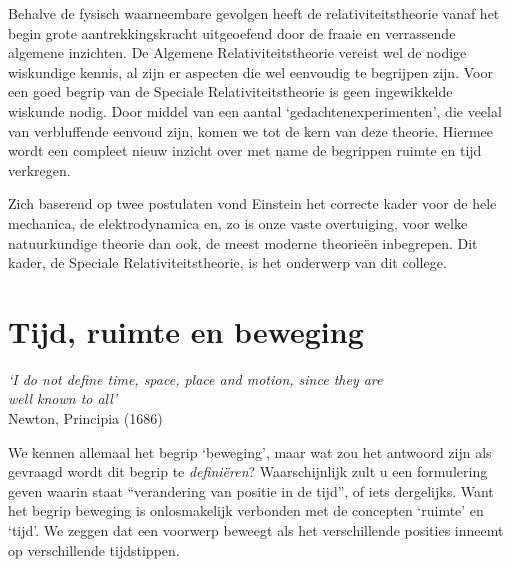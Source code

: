Behalve de fysisch waarneembare gevolgen heeft de relativiteitstheorie
vanaf het begin grote aantrekkingskracht uitgeoefend door de fraaie en
verrassende algemene inzichten. De Algemene Relativiteitstheorie
vereist wel de nodige wiskundige kennis, al zijn er aspecten die wel
eenvoudig te begrijpen zijn. Voor een goed begrip van de Speciale
Relativiteitstheorie is geen ingewikkelde wiskunde nodig. Door middel
van een aantal `gedachtenexperimenten', die veelal van verbluffende
eenvoud zijn, komen we tot de kern van deze theorie. Hiermee wordt een
compleet nieuw inzicht over met name de begrippen ruimte en tijd
verkregen.

Zich baserend op twee postulaten vond Einstein het
 correcte kader voor de hele mechanica, de elektrodynamica en, zo is
 onze vaste overtuiging, voor welke natuurkundige theorie dan ook, de
 meest moderne theorie\"{e}n inbegrepen. Dit kader, de Speciale
 Relativiteitstheorie, is het onderwerp van dit college.

\section{Tijd, ruimte en beweging} 
\begin{flushright}
{\it `I do not define time, space, place and motion, since they are \\ well known to all'} \\ Newton, Principia (1686)
\end{flushright}
We kennen allemaal het begrip `beweging', maar wat zou het antwoord
zijn als gevraagd wordt dit begrip te {\it defini\"eren}? Waarschijnlijk
zult u een formulering geven waarin staat ``verandering van positie in
de tijd'', of iets dergelijks. Want het begrip beweging is
onlosmakelijk verbonden met de concepten `ruimte' en `tijd'. We zeggen
dat een voorwerp beweegt als het verschillende posities inneemt op
verschillende tijdstippen.

